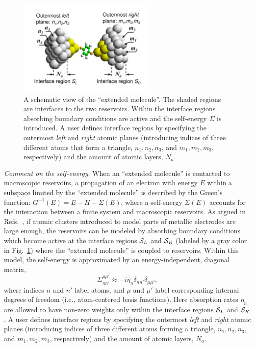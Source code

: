 \begin{figure} 
\centering
\includegraphics[width=0.6\textwidth]{fig_extended_molecule.pdf}
\caption{%
\label{fig:extended_molecule} A schematic view of the
``extended molecule''.  The shaded regions are interfaces to the two
reservoirs. Within the interface regions absorbing boundary conditions
are active and the self-energy $\Sigma$ is introduced. A user defines
interface regions by specifying the outermost \textit{left} and
\textit{right} atomic planes (introducing indices of three different atoms
that form a triangle, $n_1,n_2,n_3$, and $m_1,m_2,m_3$, respectively)
and the amount of atomic layers, $N_a$.  } 
\end{figure}

\emph{Comment on the self-energy}. When an ``extended molecule''
is contacted to macroscopic reservoirs, a propagation of an electron
with energy $E$ within a subspace limited by the ``extended molecule''
is described by the Green's function: $ G^{-1}(E) = E - H - \Sigma(E)
$, where a self-energy $\Sigma(E)$ accounts for the interaction
between a finite system and macroscopic reservoirs.  As argued in
Refs.~\cite{Arnold2007,Evers2006}, if atomic clusters introduced to model parts
of metallic electrodes are large enough, the reservoirs can be modeled
by absorbing boundary conditions which become active at the interface
regions ${\cal S}_L$ and ${\cal S}_R$ (labeled by a gray color in
Fig.~\ref{fig:extended_molecule}) where the ``extended molecule'' is
coupled to reservoirs. Within this model, the self-energy is approximated
by an energy-independent, diagonal matrix, 
\[
 \Sigma^{\mu\mu'}_{nn'} \approx - i \eta_n \delta_{nn'}\delta_{\mu\mu'},
\] 
where indices $n$ and $n'$ label atoms, and $\mu$ and $\mu'$ label
corresponding internal degrees of freedom (i.e., atom-centered basis
functions). Here absorption rates $\eta_n$ are allowed to have non-zero
weights only within the interface regions ${\cal S}_L$ and ${\cal S}_R$.
A user defines interface regions by specifying the outermost \textit{left}
and \textit{right} atomic planes (introducing indices of three different
atoms forming a triangle, $n_1,n_2,n_3$, and $m_1,m_2,m_3$, respectively)
and the amount of atomic layers, $N_a$.  

